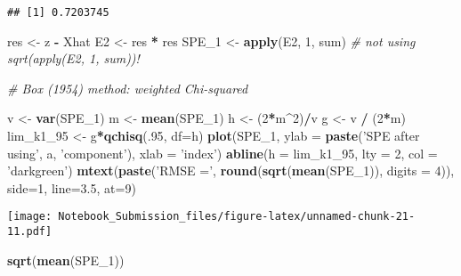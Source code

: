 \documentclass[
]{article}
\newenvironment{Shaded}{\begin{snugshade}}{\end{snugshade}}
\newcommand{\CommentTok}[1]{\textcolor[rgb]{0.56,0.35,0.01}{\textit{#1}}}
\newcommand{\DataTypeTok}[1]{\textcolor[rgb]{0.13,0.29,0.53}{#1}}
\newcommand{\DecValTok}[1]{\textcolor[rgb]{0.00,0.00,0.81}{#1}}
\newcommand{\FloatTok}[1]{\textcolor[rgb]{0.00,0.00,0.81}{#1}}
\newcommand{\KeywordTok}[1]{\textcolor[rgb]{0.13,0.29,0.53}{\textbf{#1}}}
\newcommand{\NormalTok}[1]{#1}
\newcommand{\OperatorTok}[1]{\textcolor[rgb]{0.81,0.36,0.00}{\textbf{#1}}}
\newcommand{\StringTok}[1]{\textcolor[rgb]{0.31,0.60,0.02}{#1}}
\begin{document}
\begin{verbatim}
## [1] 0.7203745
\end{verbatim}

\begin{Shaded}
\begin{Highlighting}[]
\NormalTok{res <-}\StringTok{ }\NormalTok{z }\OperatorTok{-}\StringTok{ }\NormalTok{Xhat}
\NormalTok{E2 <-}\StringTok{ }\NormalTok{res }\OperatorTok{*}\StringTok{ }\NormalTok{res}
\NormalTok{SPE_}\DecValTok{1}\NormalTok{ <-}\StringTok{ }\KeywordTok{apply}\NormalTok{(E2, }\DecValTok{1}\NormalTok{, sum) }\CommentTok{# not using sqrt(apply(E2, 1, sum))!}

\CommentTok{# Box (1954) method: weighted Chi-squared}

\NormalTok{v <-}\StringTok{ }\KeywordTok{var}\NormalTok{(SPE_}\DecValTok{1}\NormalTok{)}
\NormalTok{m <-}\StringTok{ }\KeywordTok{mean}\NormalTok{(SPE_}\DecValTok{1}\NormalTok{)}
\NormalTok{h <-}\StringTok{ }\NormalTok{(}\DecValTok{2}\OperatorTok{*}\NormalTok{m}\OperatorTok{^}\DecValTok{2}\NormalTok{)}\OperatorTok{/}\NormalTok{v}
\NormalTok{g <-}\StringTok{ }\NormalTok{v }\OperatorTok{/}\StringTok{ }\NormalTok{(}\DecValTok{2}\OperatorTok{*}\NormalTok{m)}
\NormalTok{lim_k1_}\DecValTok{95}\NormalTok{ <-}\StringTok{ }\NormalTok{g}\OperatorTok{*}\KeywordTok{qchisq}\NormalTok{(.}\DecValTok{95}\NormalTok{, }\DataTypeTok{df=}\NormalTok{h) }
\KeywordTok{plot}\NormalTok{(SPE_}\DecValTok{1}\NormalTok{, }\DataTypeTok{ylab =} \KeywordTok{paste}\NormalTok{(}\StringTok{'SPE after using'}\NormalTok{, a, }\StringTok{'component'}\NormalTok{), }\DataTypeTok{xlab =} \StringTok{'index'}\NormalTok{)}
\KeywordTok{abline}\NormalTok{(}\DataTypeTok{h =}\NormalTok{ lim_k1_}\DecValTok{95}\NormalTok{, }\DataTypeTok{lty =} \DecValTok{2}\NormalTok{, }\DataTypeTok{col =} \StringTok{'darkgreen'}\NormalTok{)}
\KeywordTok{mtext}\NormalTok{(}\KeywordTok{paste}\NormalTok{(}\StringTok{'RMSE ='}\NormalTok{, }\KeywordTok{round}\NormalTok{(}\KeywordTok{sqrt}\NormalTok{(}\KeywordTok{mean}\NormalTok{(SPE_}\DecValTok{1}\NormalTok{)), }\DataTypeTok{digits =} \DecValTok{4}\NormalTok{)), }\DataTypeTok{side=}\DecValTok{1}\NormalTok{, }\DataTypeTok{line=}\FloatTok{3.5}\NormalTok{, }\DataTypeTok{at=}\DecValTok{9}\NormalTok{)}
\end{Highlighting}
\end{Shaded}

\texttt{[image: Notebook\_Submission\_files/figure-latex/unnamed-chunk-21-11.pdf]}

\begin{Shaded}
\begin{Highlighting}[]
\KeywordTok{sqrt}\NormalTok{(}\KeywordTok{mean}\NormalTok{(SPE_}\DecValTok{1}\NormalTok{))}
\end{Highlighting}
\end{Shaded}
\end{document}
